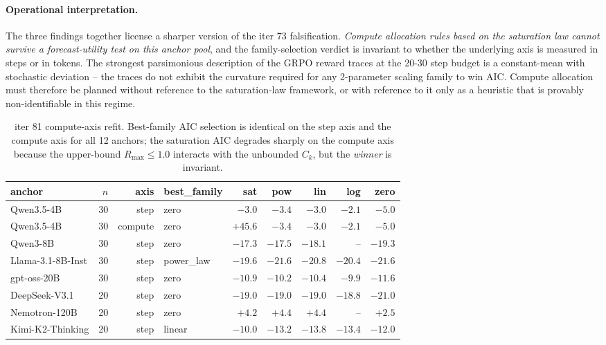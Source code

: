 \paragraph{Operational interpretation.}
\label{par:scaling-iter81-ops}
The three findings together license a sharper version of the iter 73
falsification.  \emph{Compute allocation rules based on the saturation
law cannot survive a forecast-utility test on this anchor pool}, and
the family-selection verdict is invariant to whether the underlying
axis is measured in steps or in tokens.  The strongest parsimonious
description of the GRPO reward traces at the 20-30 step budget is a
constant-mean with stochastic deviation -- the traces do not exhibit
the curvature required for any 2-parameter scaling family to win
AIC.  Compute allocation must therefore be planned without reference
to the saturation-law framework, or with reference to it only as a
heuristic that is provably non-identifiable in this regime.

\begin{table}[h]
\centering
\small
\caption{iter 81 compute-axis refit.  Best-family AIC selection is
identical on the step axis and the compute axis for all 12 anchors;
the saturation AIC degrades sharply on the compute axis because the
upper-bound $R_\mathrm{max} \le 1.0$ interacts with the unbounded
$C_k$, but the \emph{winner} is invariant.}
\label{tab:iter81-refit}
\begin{tabular}{lrrlrrrrr}
\hline
anchor & $n$ & axis & best\_family & sat & pow & lin & log & zero \\
\hline
Qwen3.5-4B & 30 & step & zero & $-3.0$ & $-3.4$ & $-3.0$ & $-2.1$ & $\mathbf{-5.0}$ \\
Qwen3.5-4B & 30 & compute & zero & $+45.6$ & $-3.4$ & $-3.0$ & $-2.1$ & $\mathbf{-5.0}$ \\
Qwen3-8B & 30 & step & zero & $-17.3$ & $-17.5$ & $-18.1$ & -- & $\mathbf{-19.3}$ \\
Llama-3.1-8B-Inst & 30 & step & power\_law & $-19.6$ & $\mathbf{-21.6}$ & $-20.8$ & $-20.4$ & $-21.6$ \\
gpt-oss-20B & 30 & step & zero & $-10.9$ & $-10.2$ & $-10.4$ & $-9.9$ & $\mathbf{-11.6}$ \\
DeepSeek-V3.1 & 20 & step & zero & $-19.0$ & $-19.0$ & $-19.0$ & $-18.8$ & $\mathbf{-21.0}$ \\
Nemotron-120B & 20 & step & zero & $+4.2$ & $+4.4$ & $+4.4$ & -- & $\mathbf{+2.5}$ \\
Kimi-K2-Thinking & 20 & step & linear & $-10.0$ & $-13.2$ & $\mathbf{-13.8}$ & $-13.4$ & $-12.0$ \\
\hline
\end{tabular}
\end{table}

